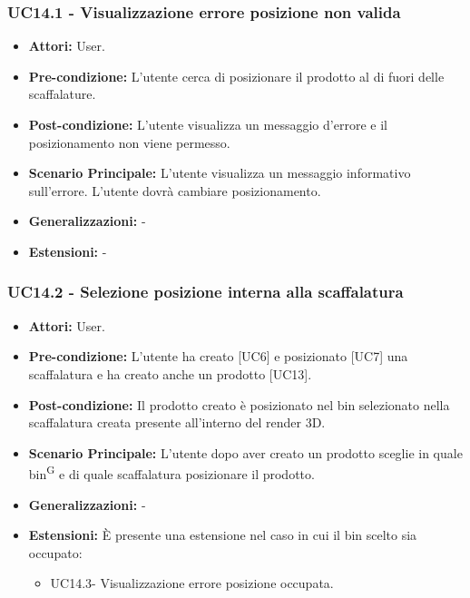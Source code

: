 \subsubsection{UC14.1 - Visualizzazione errore posizione non valida}
\begin{itemize}
    \item \textbf{Attori:} User.
    \item \textbf{Pre-condizione:}  L'utente cerca di posizionare il prodotto al di fuori delle scaffalature.
    \item \textbf{Post-condizione:} L'utente visualizza un messaggio d'errore e il posizionamento non viene permesso.
    \item \textbf{Scenario Principale:} L'utente visualizza un messaggio informativo sull'errore. L'utente dovrà cambiare posizionamento.
    \item \textbf{Generalizzazioni:} -
    \item \textbf{Estensioni:} -
\end{itemize}


\subsubsection{UC14.2 - Selezione posizione interna alla scaffalatura}
\begin{itemize}
    \item \textbf{Attori:} User.
    \item \textbf{Pre-condizione:}  L'utente ha creato [UC6] e posizionato [UC7] una scaffalatura e ha creato anche un prodotto [UC13]. 
    \item \textbf{Post-condizione:} Il prodotto creato è posizionato nel bin selezionato nella scaffalatura creata presente all'interno del render 3D.
    \item \textbf{Scenario Principale:} L'utente dopo aver creato un prodotto sceglie in quale bin\textsuperscript{G} e di quale scaffalatura posizionare il prodotto.
    \item \textbf{Generalizzazioni:} -
    \item \textbf{Estensioni:} È presente una estensione nel caso in cui il bin scelto sia occupato:
    \begin{itemize}
        \item UC14.3- Visualizzazione errore posizione occupata.
    \end{itemize}
\end{itemize}


